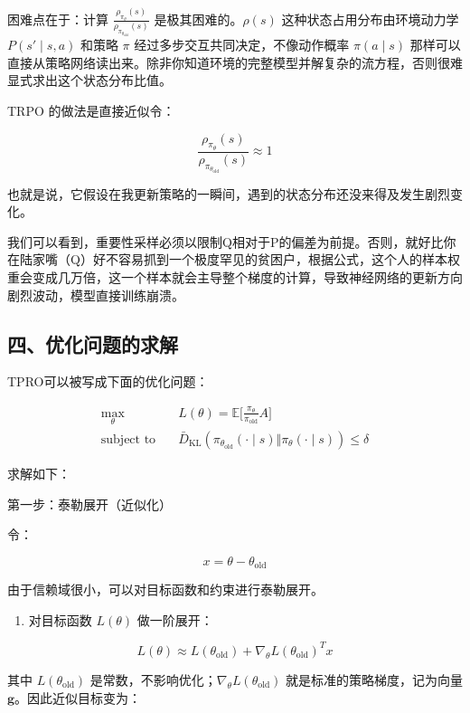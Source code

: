 困难点在于：计算 \(\frac{\rho_{\pi_\theta}(s)}{\rho_{\pi_{\theta_{\mathrm{old}}}}(s)}\) 是极其困难的。\(\rho(s)\) 这种状态占用分布由环境动力学 \(P(s'\mid s,a)\) 和策略 \(\pi\) 经过多步交互共同决定，不像动作概率 \(\pi(a\mid s)\) 那样可以直接从策略网络读出来。除非你知道环境的完整模型并解复杂的流方程，否则很难显式求出这个状态分布比值。

TRPO 的做法是直接近似令：

\[
\frac{\rho_{\pi_\theta}(s)}{\rho_{\pi_{\theta_{\mathrm{old}}}}(s)}\approx 1
\]

也就是说，它假设在我更新策略的一瞬间，遇到的状态分布还没来得及发生剧烈变化。

我们可以看到，重要性采样必须以限制Q相对于P的偏差为前提。否则，就好比你在陆家嘴（Q）好不容易抓到一个极度罕见的贫困户，根据公式，这个人的样本权重会变成几万倍，这一个样本就会主导整个梯度的计算，导致神经网络的更新方向剧烈波动，模型直接训练崩溃。

\hypertarget{ux56dbux4f18ux5316ux95eeux9898ux7684ux6c42ux89e3}{%
\subsection{四、优化问题的求解}\label{ux56dbux4f18ux5316ux95eeux9898ux7684ux6c42ux89e3}}

TPRO可以被写成下面的优化问题：

\[
\begin{aligned}
\max_\theta\quad
& L(\theta)=\mathbb{E}
\bigl[
\frac{\pi_\theta}{\pi_{\mathrm{old}}}A
\bigr] \\
\text{subject to}\quad
& \bar{D}_{\mathrm{KL}}(
\pi_{\theta_{\mathrm{old}}}(\cdot\mid s)
\Vert
\pi_\theta(\cdot\mid s)
)\le \delta
\end{aligned}
\]

求解如下：

第一步：泰勒展开（近似化）

令：

\[
x=\theta-\theta_{\mathrm{old}}
\]

由于信赖域很小，可以对目标函数和约束进行泰勒展开。

\begin{enumerate}
\def\labelenumi{\arabic{enumi}.}
\tightlist
\item
  对目标函数 \(L(\theta)\) 做一阶展开：
\end{enumerate}

\[
L(\theta)\approx
L(\theta_{\mathrm{old}})
+
\nabla_\theta L(\theta_{\mathrm{old}})^{T}x
\]

其中 \(L(\theta_{\mathrm{old}})\) 是常数，不影响优化；\(\nabla_\theta L(\theta_{\mathrm{old}})\) 就是标准的策略梯度，记为向量 \(\mathbf{g}\)。因此近似目标变为：


